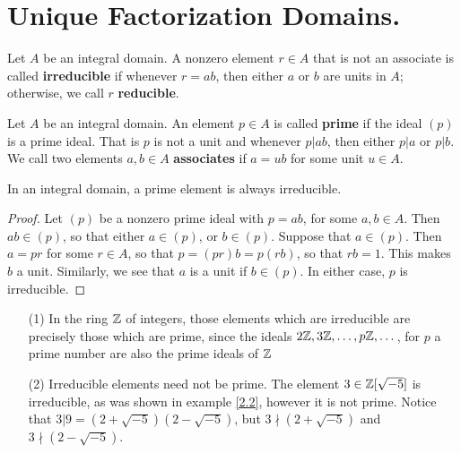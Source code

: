 \section{Unique Factorization Domains.}

\begin{definition}
    Let $A$ be an integral domain. A nonzero element  $r \in A$ that is not an
    associate is called \textbf{irreducible} if whenever $r=ab$, then either $a$
    or $b$ are units in $A$; otherwise, we call $r$ \textbf{reducible}.
\end{definition}

\begin{definition}
    Let $A$ be an integral domain. An element $p \in A$ is called \textbf{prime}
    if the ideal $(p)$ is a prime ideal. That is $p$ is not a unit and whenever
     $p|ab$, then either  $p|a$ or $p|b$. We call two elements $a,b \in A$
     \textbf{associates} if $a=ub$ for some unit $u \in A$.
\end{definition}

\begin{lemma}\label{2.3.1}
    In an integral domain, a prime element is always irreducible.
\end{lemma}
\begin{proof}
    Let $(p)$ be a nonzero prime ideal with $p=ab$, for some  $a,b \in A$. Then
     $ab \in (p)$, so that either $a \in (p)$, or $b \in (p)$. Suppose that $a
     \in (p)$. Then $a=pr$ for some  $r \in A$, so that  $p=(pr)b=p(rb)$, so
     that $rb=1$. This makes $b$ a unit. Similarly, we see that $a$ is a unit if
      $b \in (p)$. In either case, $p$ is irreducible.
\end{proof}

\begin{example}\label{2.6}
    \begin{enumerate}
        \item[(1)] In the ring $\mathbb{Z}$ of integers, those elements which are
            irreducible are precisely those which are prime, since the ideals
            $2\mathbb{Z}, 3\mathbb{Z}, \dots, p\mathbb{Z}, \dots$, for  $p$ a prime number are also the
            prime ideals of $\mathbb{Z}$

        \item[(2)] Irreducible elements need not be prime. The element $3 \in
            \mathbb{Z}[\sqrt{-5}]$ is irreducible, as was shown in example \ref{2.2},
            however it is not prime. Notice that
            $3|9=(2+\sqrt{-5})(2-\sqrt{-5})$, but $3 \nmid (2+\sqrt{-5})$ and
            $3 \nmid (2-\sqrt{-5})$.
    \end{enumerate}
\end{example}

